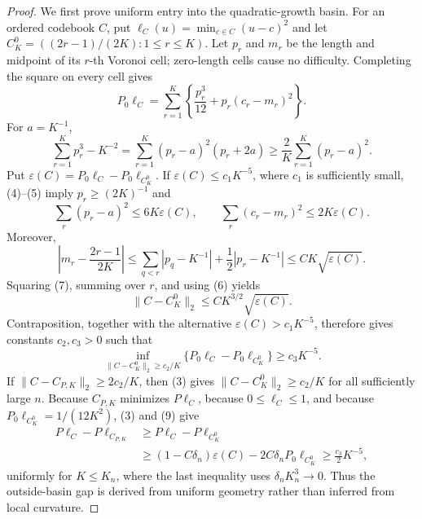 \documentclass{article}
\begin{document}
\begin{proof}
We first prove uniform entry into the quadratic-growth basin.  For an ordered codebook \(C\), put \(\ell_C(u)=\min_{c\in C}(u-c)^2\) and let \(C_K^0=((2r-1)/(2K):1\leq r\leq K)\).  Let \(p_r\) and \(m_r\) be the length and midpoint of its \(r\)-th Voronoi cell; zero-length cells cause no difficulty.  Completing the square on every cell gives
\[
 P_0\ell_C=\sum_{r=1}^K\left\{\frac{p_r^3}{12}+p_r(c_r-m_r)^2\right\}.       \tag{4}
\]
For \(a=K^{-1}\),
\[
 \sum_{r=1}^Kp_r^3-K^{-2}
 =\sum_{r=1}^K(p_r-a)^2(p_r+2a)
 \geq\frac2K\sum_{r=1}^K(p_r-a)^2.                                         \tag{5}
\]
Put \(\varepsilon(C)=P_0\ell_C-P_0\ell_{C_K^0}\).  If \(\varepsilon(C)\leq c_1K^{-5}\), where \(c_1\) is sufficiently small, (4)--(5) imply \(p_r\geq(2K)^{-1}\) and
\[
 \sum_r(p_r-a)^2\leq6K\varepsilon(C),\qquad
 \sum_r(c_r-m_r)^2\leq2K\varepsilon(C).                                    \tag{6}
\]
Moreover,
\[
 \left|m_r-\frac{2r-1}{2K}\right|
 \leq\sum_{q<r}|p_q-K^{-1}|+\frac12|p_r-K^{-1}|
 \leq CK\sqrt{\varepsilon(C)}.                                              \tag{7}
\]
Squaring (7), summing over \(r\), and using (6) yields
\[
 \|C-C_K^0\|_2\leq CK^{3/2}\sqrt{\varepsilon(C)}.                           \tag{8}
\]
Contraposition, together with the alternative \(\varepsilon(C)>c_1K^{-5}\), therefore gives constants \(c_2,c_3>0\) such that
\[
 \inf_{\|C-C_K^0\|_2\geq c_2/K}
 \{P_0\ell_C-P_0\ell_{C_K^0}\}\geq c_3K^{-5}.                              \tag{9}
\]
If \(\|C-C_{P,K}\|_2\geq2c_2/K\), then (3) gives \(\|C-C_K^0\|_2\geq c_2/K\) for all sufficiently large \(n\).  Because \(C_{P,K}\) minimizes \(P\ell_C\), because \(0\leq\ell_C\leq1\), and because \(P_0\ell_{C_K^0}=1/(12K^2)\), (3) and (9) give
\[
\begin{aligned}
 P\ell_C-P\ell_{C_{P,K}}
 &\geq P\ell_C-P\ell_{C_K^0}\\
 &\geq(1-C\delta_n)\varepsilon(C)-2C\delta_nP_0\ell_{C_K^0}
 \geq \frac{c_3}{2}K^{-5},
\end{aligned}                                                               \tag{10}
\]
uniformly for \(K\leq K_n\), where the last inequality uses \(\delta_nK_n^3\to0\).  Thus the outside-basin gap is derived from uniform geometry rather than inferred from local curvature.


\end{proof}
\end{document}

